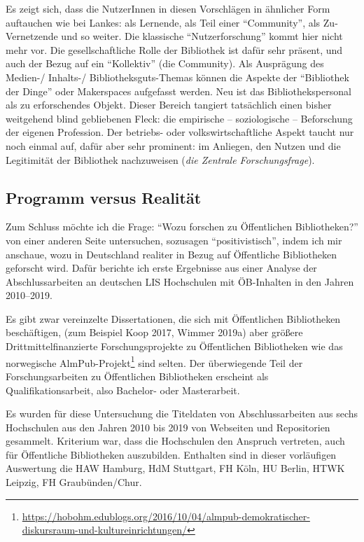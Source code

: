 \documentclass[a4paper,
fontsize=11pt,
oneside,
numbers=noperiodatend,
parskip=half-,
bibliography=totoc,
final
]{scrartcl}
\begin{document}
Es zeigt sich, dass die NutzerInnen in diesen Vorschlägen in ähnlicher
Form auftauchen wie bei Lankes: als Lernende, als Teil einer
\enquote{Community}, als Zu-Vernetzende und so weiter. Die klassische
\enquote{Nutzerforschung} kommt hier nicht mehr vor. Die
gesellschaftliche Rolle der Bibliothek ist dafür sehr präsent, und auch
der Bezug auf ein \enquote{Kollektiv} (die Community). Als Ausprägung
des Medien-/ Inhalts-/ Bibliotheksguts-Themas können die Aspekte der
\enquote{Bibliothek der Dinge} oder Makerspaces aufgefasst werden. Neu
ist das Bibliothekspersonal als zu erforschendes Objekt. Dieser Bereich
tangiert tatsächlich einen bisher weitgehend blind gebliebenen Fleck:
die empirische -- soziologische -- Beforschung der eigenen Profession.
Der betriebs- oder volkswirtschaftliche Aspekt taucht nur noch einmal
auf, dafür aber sehr prominent: im Anliegen, den Nutzen und die
Legitimität der Bibliothek nachzuweisen (\emph{die Zentrale
Forschungsfrage}).

\hypertarget{programm-versus-realituxe4t}{%
\subsection{Programm versus Realität}\label{programm-versus-realituxe4t}}

Zum Schluss möchte ich die Frage: \enquote{Wozu forschen zu Öffentlichen
Bibliotheken?} von einer anderen Seite untersuchen, sozusagen
\enquote{positivistisch}, indem ich mir anschaue, wozu in Deutschland
realiter in Bezug auf Öffentliche Bibliotheken geforscht wird. Dafür
berichte ich erste Ergebnisse aus einer Analyse der Abschlussarbeiten an
deutschen LIS Hochschulen mit ÖB-Inhalten in den Jahren 2010--2019.

Es gibt zwar vereinzelte Dissertationen, die sich mit Öffentlichen
Bibliotheken beschäftigen, (zum Beispiel Koop 2017, Wimmer 2019a) aber
größere Drittmittelfinanzierte Forschungsprojekte zu Öffentlichen
Bibliotheken wie das norwegische AlmPub-Projekt\footnote{\url{https://hobohm.edublogs.org/2016/10/04/almpub-demokratischer-diskursraum-und-kultureinrichtungen/}}
sind selten. Der überwiegende Teil der Forschungsarbeiten zu
Öffentlichen Bibliotheken erscheint als Qualifikationsarbeit, also
Bachelor- oder Masterarbeit.

Es wurden für diese Untersuchung die Titeldaten von Abschlussarbeiten
aus sechs Hochschulen aus den Jahren 2010 bis 2019 von Webseiten und
Repositorien gesammelt. Kriterium war, dass die Hochschulen den Anspruch
vertreten, auch für Öffentliche Bibliotheken auszubilden. Enthalten sind
in dieser vorläufigen Auswertung die HAW Hamburg, HdM Stuttgart, FH
Köln, HU Berlin, HTWK Leipzig, FH Graubünden/Chur.
\end{document}
